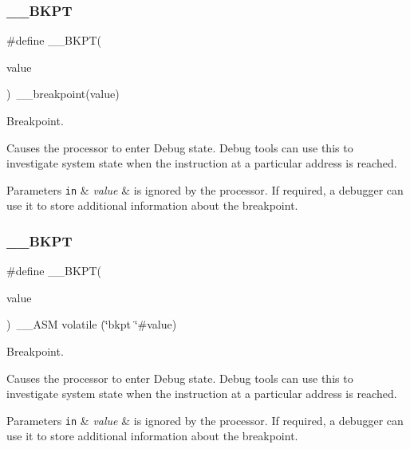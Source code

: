 \subsubsection{\texorpdfstring{\+\_\+\+\_\+\+B\+K\+PT}{\_\_BKPT}\hspace{0.1cm}{\footnotesize\ttfamily [1/3]}}
{\footnotesize\ttfamily \#define \+\_\+\+\_\+\+B\+K\+PT(\begin{DoxyParamCaption}\item[{}]{value }\end{DoxyParamCaption})~\+\_\+\+\_\+breakpoint(value)}



Breakpoint. 

Causes the processor to enter Debug state. Debug tools can use this to investigate system state when the instruction at a particular address is reached. 
\begin{DoxyParams}[1]{Parameters}
\mbox{\tt in}  & {\em value} & is ignored by the processor. If required, a debugger can use it to store additional information about the breakpoint. \\
\hline
\end{DoxyParams}
\mbox{\label{group___c_m_s_i_s___core___instruction_interface_ga15ea6bd3c507d3e81c3b3a1258e46397}} 
\subsubsection{\texorpdfstring{\+\_\+\+\_\+\+B\+K\+PT}{\_\_BKPT}\hspace{0.1cm}{\footnotesize\ttfamily [2/3]}}
{\footnotesize\ttfamily \#define \+\_\+\+\_\+\+B\+K\+PT(\begin{DoxyParamCaption}\item[{}]{value }\end{DoxyParamCaption})~\+\_\+\+\_\+\+A\+SM volatile (\char`\"{}bkpt \char`\"{}\#value)}



Breakpoint. 

Causes the processor to enter Debug state. Debug tools can use this to investigate system state when the instruction at a particular address is reached. 
\begin{DoxyParams}[1]{Parameters}
\mbox{\tt in}  & {\em value} & is ignored by the processor. If required, a debugger can use it to store additional information about the breakpoint. \\
\hline
\end{DoxyParams}
\mbox{\label{group___c_m_s_i_s___core___instruction_interface_ga15ea6bd3c507d3e81c3b3a1258e46397}} 
